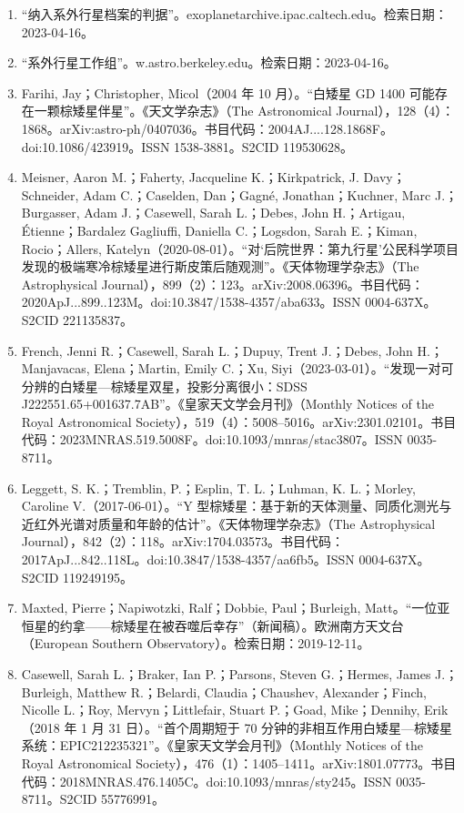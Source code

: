 \begin{enumerate}
\item “纳入系外行星档案的判据”。exoplanetarchive.ipac.caltech.edu。检索日期：2023-04-16。
\item “系外行星工作组”。w.astro.berkeley.edu。检索日期：2023-04-16。
\item Farihi, Jay；Christopher, Micol（2004 年 10 月）。“白矮星 GD 1400 可能存在一颗棕矮星伴星”。《天文学杂志》（The Astronomical Journal），128（4）：1868。arXiv:astro-ph/0407036。书目代码：2004AJ....128.1868F。doi:10.1086/423919。ISSN 1538-3881。S2CID 119530628。
\item Meisner, Aaron M.；Faherty, Jacqueline K.；Kirkpatrick, J. Davy；Schneider, Adam C.；Caselden, Dan；Gagné, Jonathan；Kuchner, Marc J.；Burgasser, Adam J.；Casewell, Sarah L.；Debes, John H.；Artigau, Étienne；Bardalez Gagliuffi, Daniella C.；Logsdon, Sarah E.；Kiman, Rocio；Allers, Katelyn（2020-08-01）。“对‘后院世界：第九行星’公民科学项目发现的极端寒冷棕矮星进行斯皮策后随观测”。《天体物理学杂志》（The Astrophysical Journal），899（2）：123。arXiv:2008.06396。书目代码：2020ApJ...899..123M。doi:10.3847/1538-4357/aba633。ISSN 0004-637X。S2CID 221135837。
\item French, Jenni R.；Casewell, Sarah L.；Dupuy, Trent J.；Debes, John H.；Manjavacas, Elena；Martin, Emily C.；Xu, Siyi（2023-03-01）。“发现一对可分辨的白矮星—棕矮星双星，投影分离很小：SDSS J222551.65+001637.7AB”。《皇家天文学会月刊》（Monthly Notices of the Royal Astronomical Society），519（4）：5008–5016。arXiv:2301.02101。书目代码：2023MNRAS.519.5008F。doi:10.1093/mnras/stac3807。ISSN 0035-8711。
\item Leggett, S. K.；Tremblin, P.；Esplin, T. L.；Luhman, K. L.；Morley, Caroline V.（2017-06-01）。“Y 型棕矮星：基于新的天体测量、同质化测光与近红外光谱对质量和年龄的估计”。《天体物理学杂志》（The Astrophysical Journal），842（2）：118。arXiv:1704.03573。书目代码：2017ApJ...842..118L。doi:10.3847/1538-4357/aa6fb5。ISSN 0004-637X。S2CID 119249195。
\item Maxted, Pierre；Napiwotzki, Ralf；Dobbie, Paul；Burleigh, Matt。“一位亚恒星的约拿——棕矮星在被吞噬后幸存”（新闻稿）。欧洲南方天文台（European Southern Observatory）。检索日期：2019-12-11。
\item Casewell, Sarah L.；Braker, Ian P.；Parsons, Steven G.；Hermes, James J.；Burleigh, Matthew R.；Belardi, Claudia；Chaushev, Alexander；Finch, Nicolle L.；Roy, Mervyn；Littlefair, Stuart P.；Goad, Mike；Dennihy, Erik（2018 年 1 月 31 日）。“首个周期短于 70 分钟的非相互作用白矮星—棕矮星系统：EPIC212235321”。《皇家天文学会月刊》（Monthly Notices of the Royal Astronomical Society），476（1）：1405–1411。arXiv:1801.07773。书目代码：2018MNRAS.476.1405C。doi:10.1093/mnras/sty245。ISSN 0035-8711。S2CID 55776991。

\end{enumerate}
